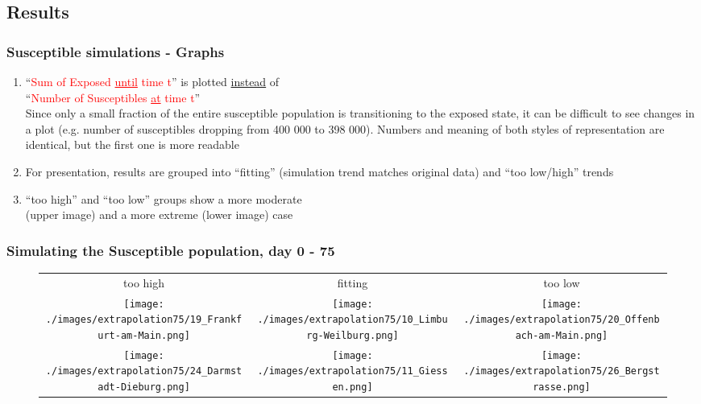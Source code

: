 \documentclass{beamer}
\begin{document}
\subsection{Results}
\begin{frame}
	\frametitle{Susceptible simulations - Graphs}
	\begin{enumerate}[$\bullet$]
		\item ``\textcolor{red}{Sum of Exposed \underline{until} time t}'' is plotted \underline{instead} of\\``\textcolor{red}{Number of Susceptibles \underline{at} time t}''\\
			Since only a small fraction of the entire susceptible population is transitioning to the exposed state, it can be difficult to see 
			changes in a plot (e.g. number of susceptibles dropping from 400 000 to 398 000). Numbers and meaning of both styles of representation are identical, but the
			first one is more readable
		\item For presentation, results are grouped into ``fitting'' (simulation trend matches original data) and ``too low/high'' trends
		\item ``too high'' and ``too low'' groups show a more moderate\\(upper image) and a more extreme (lower image) case 
	\end{enumerate}
\end{frame}

\begin{frame}
	\frametitle{Simulating the Susceptible population, day 0 - 75}
	\begin{center}
		\begin{figure}
			\begin{adjustwidth}{-0.8cm}{}
			\begin{tabular}{c|c|c}
				too high & fitting & too low \\
				\texttt{[image: ./images/extrapolation75/19\_Frankfurt-am-Main.png]}
					& \texttt{[image: ./images/extrapolation75/10\_Limburg-Weilburg.png]}
					& \texttt{[image: ./images/extrapolation75/20\_Offenbach-am-Main.png]} \\
				\texttt{[image: ./images/extrapolation75/24\_Darmstadt-Dieburg.png]}
					& \texttt{[image: ./images/extrapolation75/11\_Giessen.png]}
					& \texttt{[image: ./images/extrapolation75/26\_Bergstrasse.png]}
			\end{tabular}
			\end{adjustwidth}
		\end{figure}
	\end{center}
\end{frame}
\end{document}
